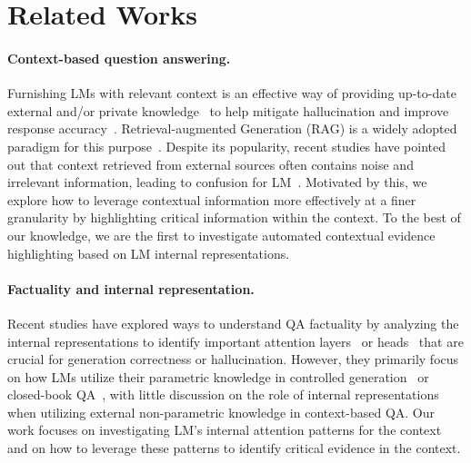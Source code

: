 \section{Related Works}\label{sec:rel}
\vspace{-5pt}
\paragraph{Context-based question answering.}
Furnishing LMs with relevant context is an effective way of providing up-to-date external and/or private knowledge~\cite{ji2023survey,selfrag} to help mitigate hallucination and improve response accuracy~\cite{hallucination_survey}. 
Retrieval-augmented Generation (RAG) is a widely adopted paradigm for this purpose~\cite{gao2023ragsurvey,fan2024ragsurvey}.
Despite its popularity, recent studies have pointed out that context retrieved from external sources often contains noise and irrelevant information, leading to confusion for LM~\cite{cuconasu2024ragnoise,wu2024ragirrelevant}.
Motivated by this, we explore how to leverage contextual information more effectively at a finer granularity by highlighting critical information within the context.
To the best of our knowledge, we are the first to investigate automated contextual evidence highlighting based on LM internal representations.

\paragraph{Factuality and internal representation.}
Recent studies have explored ways to understand QA factuality by analyzing the internal representations to identify important attention layers~\cite{yuksekgonul2023attention,chen2024sharpness} or heads~\cite{halawi2024overthinking} that are crucial for generation correctness or hallucination.
However, they primarily focus on how LMs utilize their parametric knowledge in controlled generation~\cite{yuksekgonul2023attention,halawi2024overthinking} or closed-book QA~\cite{chen2024sharpness}, with little discussion on the role of internal representations when utilizing external non-parametric knowledge in context-based QA.
Our work focuses on investigating LM's internal attention patterns for the context and on how to leverage these patterns to identify critical evidence in the context.
